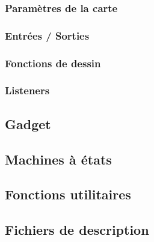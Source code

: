 \documentclass[a4paper]{article}
\begin{document}
\subsubsection{Paramètres de la carte}
\subsubsection{Entrées / Sorties}
\subsubsection{Fonctions de dessin}
\subsubsection{Listeners\label{listeners}}
\subsection{Gadget}
\subsection{Machines à états\label{statemachine}}
\subsection{Fonctions utilitaires}
\subsection{Fichiers de description}
\end{document}
